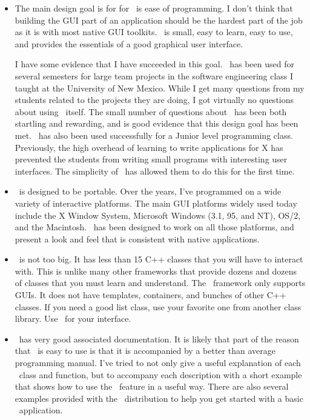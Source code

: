 \begin{itemize}

\item The main design goal is for for \V\ is ease of programming.
I don't think that building the GUI part of an application should
be the hardest part of the job as it is with most native
GUI toolkits. \V\ is
small, easy to learn, easy to use, and provides the essentials of
a good graphical user interface.

I have some evidence that I have succeeded in this goal. \V\ has
been used for several semesters for large team projects in the
software engineering class I taught at the University of New
Mexico.  While I get many questions from my students related to
the projects they are doing, I got virtually no questions about
using \V\ itself. The small number of questions about \V\ has
been both startling and rewarding, and is good evidence that this
design goal has been met. \V\ has also been used successfully
for a Junior level programming class. Previously, the high
overhead of learning to write applications for X has prevented
the students from writing small programs with interesting user
interfaces. The simplicity of \V\ has allowed them to do this for
the first time.

\item \V\ is designed to be portable. Over the years, I've programmed
on a wide variety of interactive platforms. The main GUI
platforms widely used today include the X Window System,
Microsoft Windows (3.1, 95, and NT), OS/2, and the Macintosh. \V\
has been designed to work on all those platforms, and present a
look and feel that is consistent with native applications.

\item \V\ is not too big. It has less than 15 C++ classes that you
will have to interact with. This is unlike many other frameworks
that provide dozens and dozens of classes that you must learn and
understand. The \V\ framework only supports GUIs. It does not
have templates, containers, and bunches of other C++ classes. If
you need a good list class, use your favorite one from another
class library. Use \V\ for your interface.

\item \V\ has very good associated documentation. It is likely that
part of the reason that \V\ is easy to use is that it is accompanied
by a better than average programming manual. I've tried to not only
give a useful explanation of each \V\ class and function, but to
accompany each description with a short example that shows how to
use the \V\ feature in a useful way. There are also several examples
provided with the \V\ distribution to help you get started with a
basic \V\ application.


\end{itemize}
